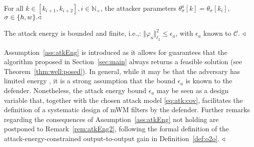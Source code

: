 \begin{assumption}\label{ass:param}
For all $k \in [k_{i+1},k_{i+2}], i \in \mathbb N_+$, the attacker parameters $\theta_\sigma^a[k]=\theta_\sigma[k_i]$, $\sigma \in \{h,w\}. \hfill\triangleleft$
\end{assumption}

\begin{assumption}\label{ass:atkEng}
    The attack energy is bounded and finite, i.e.,: $\Vert \varphi_u\Vert_{\ell_2}^2 \leq \epsilon_a$, with $\epsilon_a$ known to $\mathcal C$. $\hfill \triangleleft$
\end{assumption}

\begin{remark}
    Assumption~\ref{ass:atkEng} is introduced as it allows for guarantees that the algorithm proposed in Section~\ref{sec:main} always returns a feasible solution (see Theorem~\ref{thm:well:posed}).
    In general, %
    while it may be that the adversary has limited energy \citep{djouadi2015finite}, it is a strong assumption that the bound $\epsilon_a$ is known to the defender.
    Nonetheless, the attack energy bound $\epsilon_a$ may be seen as a design variable that, together with the chosen attack model \eqref{eq:atk:cov}, facilitates the definition of a systematic design of mWM filters by the defender.
    Further remarks regarding the consequences of Assumption~\ref{ass:atkEng} not holding are postponed to Remark~\ref{rem:atkEng2}, following the formal definition of the attack-energy-constrained output-to-output gain in Definition~\ref{def:o2o}. 
    $\hfill \triangleleft$
\end{remark}


